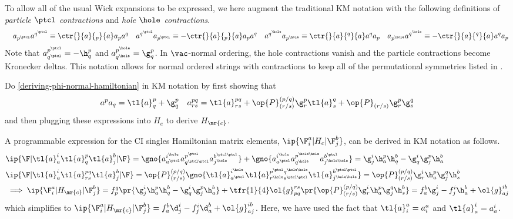 \documentclass[11pt,fleqn]{article}
\numberwithin{equation}{section}
\begin{document}
\begin{ntt}
To allow all of the usual Wick expansions to be expressed, we here augment the traditional KM notation with the following definitions of \textit{particle $\ptcl$ contractions} and \textit{hole $\hole$ contractions}.
\begin{align}
&&
  a_{p^\ptcl}a^{q^\ptcl}
\equiv
  \ctr{}{a}{_p}{a} a_pa^q
&&
  a^{q^\ptcl}a_{p^\ptcl}
\equiv
-
  \ctr{}{a}{_p}{a} a_pa^q
&&
  a^{q^\hole}a_{p^\hole}
\equiv
  \ctr{}{a}{^q}{a} a^qa_p
&&
  a_{p^\hole}a^{q^\hole}
\equiv
-
  \ctr{}{a}{^q}{a} a^qa_p
\end{align}
Note that $a^{p^\ptcl}_{q^\ptcl}=-\h^p_q$ and $a^{p^\hole}_{q^\hole}=\g_q^p$.
In $\vac$-normal ordering, the hole contractions vanish and the particle contractions become Kronecker deltas.
This notation allows for normal ordered strings with contractions to keep all of the permutational symmetries listed in .
\end{ntt}

\begin{prob}
Do \cref{deriving-phi-normal-hamiltonian} in KM notation by first showing that
\begin{align*}
  a^pa_q
=
  \tl{a}^p_q
+
  \g^p_q
&&
  a^{pq}_{rs}
=
  \tl{a}^{pq}_{rs}
+
  \op{P}^{(p/q)}_{(r/s)}\g^p_r\tl{a}^q_s
+
  \op{P}_{(r/s)}\g^p_r\g^q_s
\end{align*}
and then plugging these expressions into $H_e$ to derive $H_\mr{c}$.
\end{prob}

\begin{ex}
A programmable expression for the CI singles Hamiltonian matrix elements, $\ip{\F_i^a|H_c|\F_j^b}$,  can be derived in KM notation as follows.
\begin{align*}
&
  \ip{\F|\tl{a}_a^i\tl{a}_q^p\tl{a}_j^b|\F}
=
  \gno{
    a_{a^\ptcl}^{i^\hole}
    a_{q^{\ptcl\ptcl}}^{p^\ptcl}
    a_{j^\hole}^{b^{\ptcl\ptcl}}
  }
+
  \gno{
    a_{a^\ptcl}^{i^{\hole}}
    a_{q^{\hole}}^{p^{\hole\hole}}
    a_{j^{\hole\hole}}^{b^{\ptcl}}
  }
=
  \g^i_j\h_a^p\h_q^b
-
  \g_q^i\g_j^p\h_a^b
\\
&
  \ip{\F|\tl{a}_a^i\tl{a}^{pq}_{rs}\tl{a}_j^b|\F}
=
  \op{P}^{(p/q)}_{(r/s)}
  \gno{
    \tl{a}^{i^\hole}_{a^\ptcl}
    \tl{a}^{p^\ptcl q^{\hole\hole}}_{r^\hole s^{\ptcl\ptcl}}
    \tl{a}^{b^{\ptcl\ptcl}}_{j^{\hole\hole}}
  }
=
  \op{P}^{(p/q)}_{(r/s)}
  \g^i_r\h^p_a\g^q_j\h^b_s
\\
&
\implies
  \ip{\F_i^a|H_\mr{c}|\F_j^b}
=
  f_p^q\pr{
    \g^i_j\h_a^p\h_q^b
  -
    \g_q^i\g_j^p\h_a^b
  }
+
  \tfr{1}{4}
  \ol{g}_{pq}^{rs}\pr{
    \op{P}^{(p/q)}_{(r/s)}
    \g^i_r\h^p_a\g^q_j\h^b_s
  }
=
  f_a^b\g_j^i
-
  f_j^i\h_a^b
+
  \ol{g}^{ib}_{aj}
\end{align*}
which simplifies to
$\ip{\F_i^a|H_\mr{c}|\F_j^b}=f_a^b\d_j^i-f_j^i\d_a^b+\ol{g}^{ib}_{aj}$.
Here, we have used the fact that $\tl{a}_i^a=a_i^a$ and $\tl{a}_a^i=a_a^i$.
\end{ex}
\end{document}
